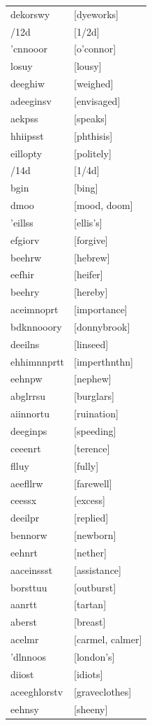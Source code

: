 \documentclass{article}
\begin{document}
\begin{tabular}{ll}
dekorswy & [dyeworks] \\
/12d & [1/2d] \\
'cnnooor & [o'connor] \\
losuy & [lousy] \\
deeghiw & [weighed] \\
adeeginsv & [envisaged] \\
aekpss & [speaks] \\
hhiipsst & [phthisis] \\
eillopty & [politely] \\
/14d & [1/4d] \\
bgin & [bing] \\
dmoo & [mood, doom] \\
'eillss & [ellis's] \\
efgiorv & [forgive] \\
beehrw & [hebrew] \\
eefhir & [heifer] \\
beehry & [hereby] \\
aceimnoprt & [importance] \\
bdknnooory & [donnybrook] \\
deeilns & [linseed] \\
ehhimnnprtt & [imperthnthn] \\
eehnpw & [nephew] \\
abglrrsu & [burglars] \\
aiinnortu & [ruination] \\
deeginps & [speeding] \\
ceeenrt & [terence] \\
flluy & [fully] \\
aeefllrw & [farewell] \\
ceessx & [excess] \\
deeilpr & [replied] \\
bennorw & [newborn] \\
eehnrt & [nether] \\
aaceinssst & [assistance] \\
borsttuu & [outburst] \\
aanrtt & [tartan] \\
aberst & [breast] \\
acelmr & [carmel, calmer] \\
'dlnnoos & [london's] \\
diiost & [idiots] \\
aceeghlorstv & [graveclothes] \\
eehnsy & [sheeny] \\

\end{tabular}
\end{document}
